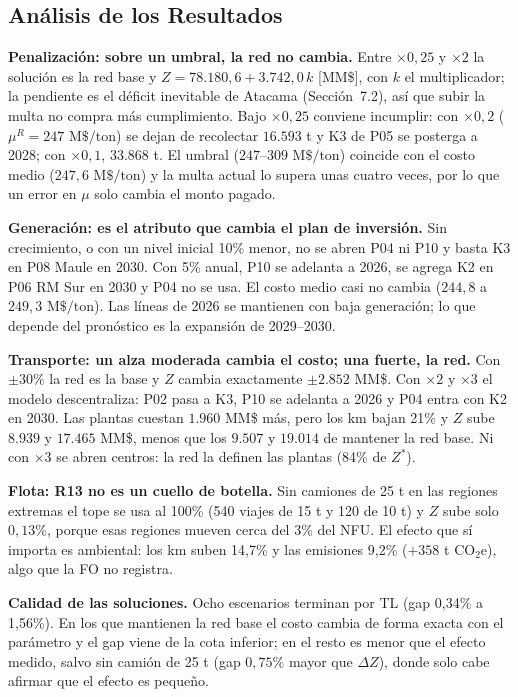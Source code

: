 \documentclass[letterpaper]{article}
\begin{document}
\subsection{Análisis de los Resultados}

\textbf{Penalización: sobre un umbral, la red no cambia.} Entre $\times0,25$ y $\times2$ la solución es la red base y $Z = 78.180,6 + 3.742,0\,k$ [MM\$], con $k$ el multiplicador; la pendiente es el déficit inevitable de Atacama (Sección~7.2), así que subir la multa no compra más cumplimiento. Bajo $\times0,25$ conviene incumplir: con $\times0,2$ ($\mu^R=247\text{ M\$/ton}$) se dejan de recolectar $16.593$ t y K3 de P05 se posterga a 2028; con $\times0,1$, $33.868$ t. El umbral ($247$--$309\text{ M\$/ton}$) coincide con el costo medio ($247,6\text{ M\$/ton}$) y la multa actual lo supera unas cuatro veces, por lo que un error en $\mu$ solo cambia el monto pagado.

\textbf{Generación: es el atributo que cambia el plan de inversión.} Sin crecimiento, o con un nivel inicial 10\% menor, no se abren P04 ni P10 y basta K3 en P08 Maule en 2030. Con 5\% anual, P10 se adelanta a 2026, se agrega K2 en P06 RM Sur en 2030 y P04 no se usa. El costo medio casi no cambia ($244,8$ a $249,3\text{ M\$/ton}$). Las líneas de 2026 se mantienen con baja generación; lo que depende del pronóstico es la expansión de 2029--2030.

\textbf{Transporte: un alza moderada cambia el costo; una fuerte, la red.} Con $\pm30\%$ la red es la base y $Z$ cambia exactamente $\pm2.852$ MM\$. Con $\times2$ y $\times3$ el modelo descentraliza: P02 pasa a K3, P10 se adelanta a 2026 y P04 entra con K2 en 2030. Las plantas cuestan $1.960$ MM\$ más, pero los km bajan 21\% y $Z$ sube $8.939$ y $17.465$ MM\$, menos que los $9.507$ y $19.014$ de mantener la red base. Ni con $\times3$ se abren centros: la red la definen las plantas (84\% de $Z^*$).

\textbf{Flota: R13 no es un cuello de botella.} Sin camiones de 25 t en las regiones extremas el tope se usa al 100\% (540 viajes de 15 t y 120 de 10 t) y $Z$ sube solo $0,13\%$, porque esas regiones mueven cerca del 3\% del NFU. El efecto que sí importa es ambiental: los km suben 14,7\% y las emisiones 9,2\% ($+358$ t CO$_2$e), algo que la FO no registra.

\textbf{Calidad de las soluciones.} Ocho escenarios terminan por TL (gap 0,34\% a 1,56\%). En los que mantienen la red base el costo cambia de forma exacta con el parámetro y el gap viene de la cota inferior; en el resto es menor que el efecto medido, salvo sin camión de 25 t (gap $0,75\%$ mayor que $\Delta Z$), donde solo cabe afirmar que el efecto es pequeño.
\end{document}

